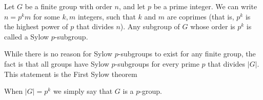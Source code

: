 \documentclass[12pt]{article}
\begin{document}
Let $G$ be a finite group with order $n$, and let $p$ be a prime integer.
We can write $n=p^k m$ for some $k,m$ integers, such that $k$ and $m$ are coprimes (that is, $p^k$ is  the highest power of $p$ that divides $n$).
Any subgroup of $G$ whose order is $p^k$ is called a Sylow $p$-subgroup.

While there is no reason for Sylow $p$-subgroups to exist for any finite group, the fact is that all groups have Sylow $p$-subgroups for every prime $p$ that divides $|G|$. This statement is the First Sylow theorem
	
When $|G|=p^k$ we simply say that $G$ is a $p$-group.
\end{document}
